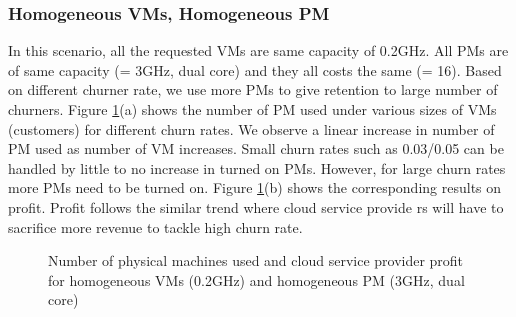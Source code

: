 \subsubsection{Homogeneous VMs, Homogeneous PM}
In this scenario, all the requested VMs are same capacity of 0.2GHz. All PMs are of same capacity (= 3GHz, dual core) and they all costs the same (= 16).  Based on different churner rate, we use more PMs to give retention to large number of churners. Figure \ref{result1}(a) shows the number of PM used under various sizes of VMs (customers) for different churn rates. We observe a linear increase in number of PM used as number of VM increases. Small churn rates such as 0.03/0.05 can be handled by little to no increase in turned on PMs. However, for large churn rates more PMs need to be turned on. Figure \ref{result1}(b) shows the corresponding results on profit. Profit follows the similar trend where cloud service provide  
rs will have to sacrifice more revenue to tackle high churn rate.
\begin{figure} [!htp]
  \centering
   \quad
  \caption{Number of physical machines used and cloud service provider profit for homogeneous VMs (0.2GHz) and homogeneous PM (3GHz, dual core)  }
  \label{result1}
\end{figure}


